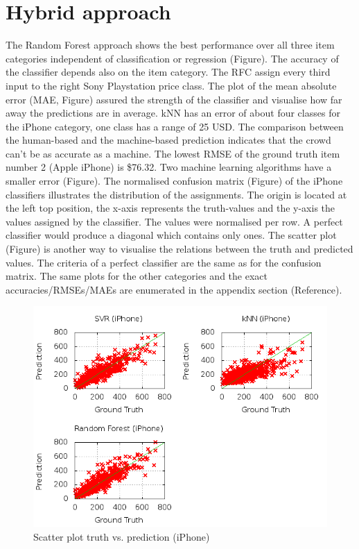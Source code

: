  

\section{Hybrid approach}
The Random Forest approach shows the best performance over all three item categories independent of classification or regression (Figure). The accuracy of the classifier depends also on the item category. The RFC assign every third input to the right Sony Playstation price class. The plot of the mean absolute error (MAE, Figure) assured the strength of the classifier and visualise how far away the predictions are in average. kNN has an error of about four classes for the iPhone category, one class has a range of 25 USD. The comparison between the human-based and the machine-based prediction indicates that the crowd can't be as accurate as a machine. The lowest RMSE of the ground truth item number 2 (Apple iPhone) is \$76.32. Two machine learning algorithms have a smaller error (Figure). 
The normalised confusion matrix (Figure) of the iPhone classifiers illustrates the distribution of the assignments. The origin is located at the left top position, the x-axis represents the truth-values and the y-axis the values assigned by the classifier. The values were normalised per row. A perfect classifier would produce a diagonal which contains only ones. 
The scatter plot (Figure) is another way to visualise the relations between the truth and predicted values. The criteria of a perfect classifier are the same as for the confusion matrix. 
The same plots for the other categories and the exact accuracies/RMSEs/MAEs are enumerated in the appendix section (Reference).
\begin{figure}
\centering
\includegraphics[scale=0.55]{images/plots/machine_learning/iphone/true_pred_iphone.png}
\caption{Scatter plot truth vs. prediction (iPhone)}
\label{truth_predict_iphone}
\end{figure}

